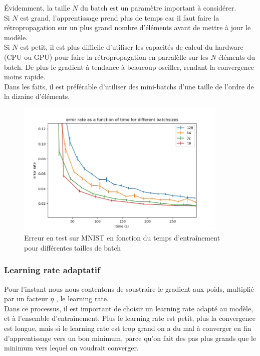 \newpage

Évidemment, la taille $N$ du batch est un paramètre important à considérer. \\
Si $N$ est grand, l'apprentissage prend plus de temps car il faut faire la rétropropagation sur un plus grand nombre d'éléments avant de mettre à jour le modèle.\\
Si $N$ est petit, il est plus difficile d'utiliser les capacités de calcul du hardware (CPU ou GPU) pour faire la rétropropagation en parralèlle sur les $N$ éléments
du batch. De plus le gradient à tendance à beaucoup osciller, rendant la convergence moins rapide.
\\

Dans les faits, il est préférable d'utiliser des mini-batchs d'une taille de l'ordre de la dizaine d'éléments. 

\begin{figure}[h]
 \centering
 \includegraphics[width=0.9\textwidth]{img/time_vs_batchsize.png}
 \caption{Erreur en test sur MNIST en fonction du temps d'entraînement pour différentes tailles de batch}
 \label{fig:time_vs_batchsize.png}
\end{figure}

\subsubsection{Learning rate adaptatif}

Pour l'instant nous nous contentons de soustraire le gradient aux poids, multiplié par un facteur $\eta$ , le learning rate.\\
Dans ce processus, il est important de choisir un learning rate adapté au modèle, et à l'ensemble d'entraînement.
Plus le learning rate est petit, plus la convergence est longue, mais si le learning rate est trop grand on a du mal à converger en fin d'apprentissage
vers un bon minimum, parce qu'on fait des pas plus grands que le minimum vers lequel on voudrait converger.


